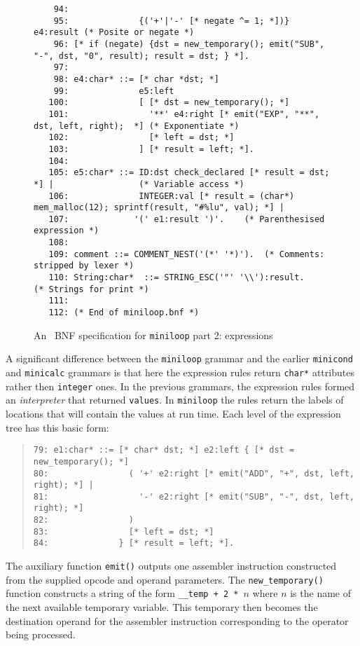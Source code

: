 \begin{figure}
\begin{minipage}{30cm}
\begin{verbatim}
    94: 
    95:              {('+'|'-' [* negate ^= 1; *])} e4:result (* Posite or negate *)
    96: [* if (negate) {dst = new_temporary(); emit("SUB", "-", dst, "0", result); result = dst; } *].
    97: 
    98: e4:char* ::= [* char *dst; *]
    99:              e5:left
   100:              [ [* dst = new_temporary(); *]
   101:                '**' e4:right [* emit("EXP", "**", dst, left, right);  *] (* Exponentiate *)
   102:                [* left = dst; *]
   103:              ] [* result = left; *].
   104: 
   105: e5:char* ::= ID:dst check_declared [* result = dst; *] |                 (* Variable access *)
   106:              INTEGER:val [* result = (char*) mem_malloc(12); sprintf(result, "#%lu", val); *] |      
   107:             '(' e1:result ')'.    (* Parenthesised expression *)
   108: 
   109: comment ::= COMMENT_NEST('(*' '*)').  (* Comments: stripped by lexer *)
   110: String:char*  ::= STRING_ESC('"' '\\'):result.     (* Strings for print *)
   111: 
   112: (* End of miniloop.bnf *)
\end{verbatim}
\end{minipage}
\caption{An \rdp\ BNF specification for {\tt miniloop} part 2: expressions}
\label{miniloop:bnf2}
\end{figure}

A significant difference between the {\tt miniloop} grammar and the earlier {\tt minicond}
and {\tt minicalc} grammars is that here the expression rules return {\tt char*} attributes
rather then {\tt integer} ones. In the previous grammars, the expression rules formed an
{\em interpreter} that returned {\tt values}. In {\tt miniloop} the rules return the labels
of locations that will contain the values at run time. Each level of the expression tree has this basic form:
\begin{quote}
\footnotesize
\begin{verbatim}
79: e1:char* ::= [* char* dst; *] e2:left { [* dst = new_temporary(); *]
80:                ( '+' e2:right [* emit("ADD", "+", dst, left, right); *] |  
81:                  '-' e2:right [* emit("SUB", "-", dst, left, right); *]    
82:                )
83:                [* left = dst; *]
84:              } [* result = left; *].
\end{verbatim}
\end{quote}
The auxiliary function \verb+emit()+ outputs one assembler instruction constructed
from the supplied opcode and operand parameters.
The \verb+new_temporary()+ function constructs a string of the form
\verb|__temp + 2 * |$n$ where $n$ is the name of the next available temporary variable.
This temporary then becomes the destination operand for the assembler instruction
corresponding to the operator being processed. 

